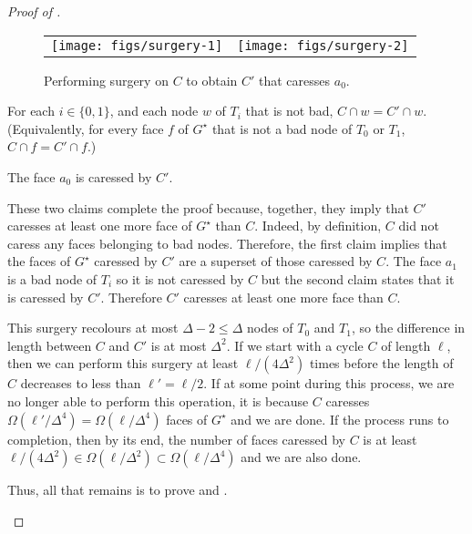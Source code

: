 \documentclass{patmorin}
\newcommand{\dual}[1]{{#1}^\star}
\begin{document}
\begin{proof}[Proof of ]
\begin{enumerate}
   \begin{figure}
     \begin{center}
       \begin{tabular}{cc}
         \texttt{[image: figs/surgery-1]} &
         \texttt{[image: figs/surgery-2]}
       \end{tabular}
     \end{center}
     \caption{Performing surgery on $C$ to obtain $C'$ that caresses $a_0$.}
   \end{figure}

   \begin{clm}
      For each $i\in\{0,1\}$, and each node $w$ of $T_i$ that is not bad,
      $C\cap w=C'\cap w$.  (Equivalently, for every face $f$ of $\dual{G}$
      that is not a bad node of $T_0$ or $T_1$, $C\cap f=C'\cap f$.)
   \end{clm}

   \begin{clm}
      The face $a_0$ is caressed by $C'$.
   \end{clm}

   These two claims complete the proof because, together, they imply that $C'$ caresses at least one more face of $\dual{G}$ than $C$.  Indeed, by definition, $C$ did not caress any faces belonging to bad nodes. Therefore, the first claim implies that the faces of $\dual{G}$ caressed by $C'$ are a superset of those caressed by $C$.  The face $a_1$ is a bad node of $T_i$ so it is not caressed by $C$ but the second claim states that it is caressed by $C'$.  Therefore $C'$ caresses at least one more face than $C$.

   This surgery recolours at most $\Delta-2\le \Delta$ nodes of $T_0$
   and $T_1$, so the difference in length between $C$ and $C'$
   is at most $\Delta^2$.  If we start with a cycle $C$
   of length $\ell$, then we can perform this surgery at least
   $\ell/(4\Delta^2)$ times before the length of $C$ decreases
   to less than $\ell'=\ell/2$. If at some point during this process,
   we are no longer able to perform this operation, it is because
   $C$ caresses $\Omega(\ell'/\Delta^4)=\Omega(\ell/\Delta^4)$
   faces of $\dual{G}$ and we are done.  If the process runs to completion, then by its end, the number of faces caressed by $C$ is at least
   $\ell/(4\Delta^2)\in\Omega(\ell/\Delta^2)\subset\Omega(\ell/\Delta^4)$
   and we are also done.

   Thus, all that remains is to prove  and
   .


\end{enumerate}
\end{proof}
\end{document}
